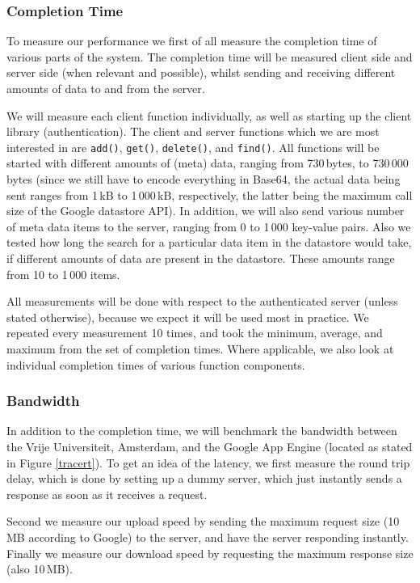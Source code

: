 \subsubsection{Completion Time}
To measure our performance we first of all measure the completion time of
various parts of the system. The completion time will be measured client side
and server side (when relevant and possible), whilst sending and receiving
different amounts of data to and from the server. 

We will measure each client function individually, as well as starting up the
client library (authentication). The client and server functions which we are
most interested in are \texttt{add()}, \texttt{get()}, \texttt{delete()}, and
\texttt{find()}. All functions will be started with different amounts of (meta)
data, ranging from 730\,bytes, to 730\,000\,bytes (since we still have to encode
everything in Base64, the actual data being sent ranges from 1\,kB to 1\,000\,kB,
respectively, the latter being the maximum call size of the Google datastore
API). In addition, we will also send various number of meta data items to the
server, ranging from 0 to 1\,000 key-value pairs. Also we tested how long the
search for a particular data item in the datastore would take, if different
amounts of data are present in the datastore. These amounts range from 10 to
1\,000 items.

All measurements will be done with respect to the authenticated server (unless
stated otherwise), because we expect it will be used most in practice. We
repeated every measurement 10 times, and took the minimum, average, and maximum
from the set of completion times. Where applicable, we also look at individual
completion times of various function components.

\subsubsection{Bandwidth}
In addition to the completion time, we will benchmark the bandwidth between the
Vrije Universiteit, Amsterdam, and the Google App Engine (located as stated in
Figure \ref{tracert}). To get an idea of the latency, we first measure the
round trip delay, which is done by setting up a dummy server, which just
instantly sends a response as soon as it receives a request. 

Second we measure our upload speed by sending the maximum request size (10\,MB
according to Google) to the server, and have the server responding instantly.
Finally we measure our download speed by requesting the maximum response size
(also 10\,MB).

